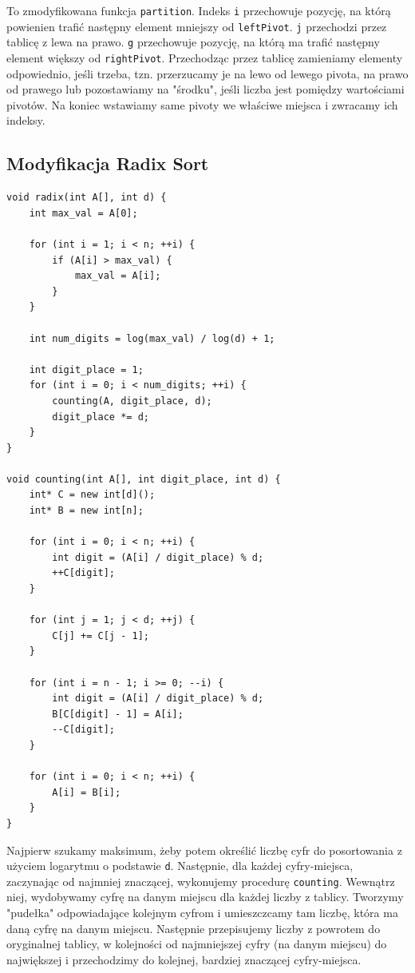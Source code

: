 \documentclass{article}
\begin{document}
To zmodyfikowana funkcja \texttt{partition}. Indeks \texttt{i} przechowuje pozycję, na którą powienien trafić następny element mniejszy od \texttt{leftPivot}. \texttt{j} przechodzi przez tablicę z lewa na prawo. \texttt{g} przechowuje pozycję, na którą ma trafić następny element większy od \texttt{rightPivot}. Przechodząc przez tablicę zamieniamy elementy odpowiednio, jeśli trzeba, tzn. przerzucamy je na lewo od lewego pivota, na prawo od prawego lub pozostawiamy na "środku", jeśli liczba jest pomiędzy wartościami pivotów. Na koniec wstawiamy same pivoty we właściwe miejsca i zwracamy ich indeksy.

\subsection{Modyfikacja Radix Sort}

\begin{verbatim}
void radix(int A[], int d) {
    int max_val = A[0];

    for (int i = 1; i < n; ++i) {
        if (A[i] > max_val) {
            max_val = A[i];
        }
    }

    int num_digits = log(max_val) / log(d) + 1;

    int digit_place = 1;
    for (int i = 0; i < num_digits; ++i) {
        counting(A, digit_place, d);
        digit_place *= d;
    }
}

void counting(int A[], int digit_place, int d) {
    int* C = new int[d]();
    int* B = new int[n];   

    for (int i = 0; i < n; ++i) {
        int digit = (A[i] / digit_place) % d;
        ++C[digit];
    }

    for (int j = 1; j < d; ++j) {
        C[j] += C[j - 1];
    }

    for (int i = n - 1; i >= 0; --i) {
        int digit = (A[i] / digit_place) % d;
        B[C[digit] - 1] = A[i];
        --C[digit];
    }

    for (int i = 0; i < n; ++i) {
        A[i] = B[i];
    }
}
\end{verbatim}

Najpierw szukamy maksimum, żeby potem określić liczbę cyfr do posortowania z użyciem logarytmu o podstawie \texttt{d}. Następnie, dla każdej cyfry-miejsca, zaczynając od najmniej znaczącej, wykonujemy procedurę \texttt{counting}. Wewnątrz niej, wydobywamy cyfrę na danym miejscu dla każdej liczby z tablicy. Tworzymy "pudełka" odpowiadające kolejnym cyfrom i umieszczcamy tam liczbę, która ma daną cyfrę na danym miejscu. Następnie przepisujemy liczby z powrotem do oryginalnej tablicy, w kolejności od najmniejszej cyfry (na danym miejscu) do największej i przechodzimy do kolejnej, bardziej znaczącej cyfry-miejsca.
\end{document}
